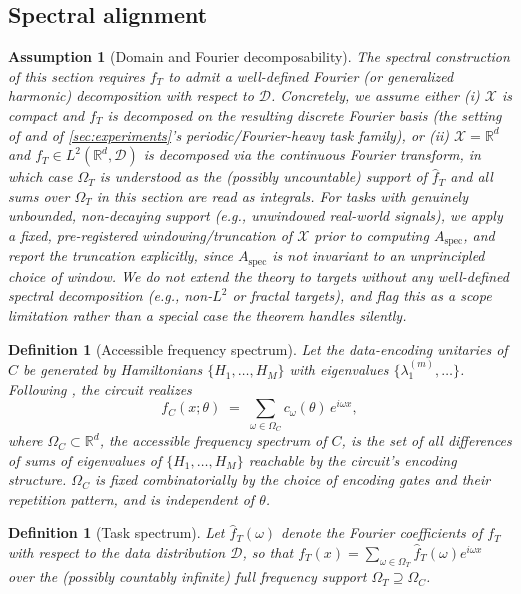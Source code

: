 \documentclass[11pt]{article}
\newtheorem{definition}[theorem]{Definition}
\newtheorem{assumption}[theorem]{Assumption}
\newcommand{\Aspec}{A_{\mathrm{spec}}}
\newcommand{\R}{\mathbb{R}}
\newcommand{\fT}{f_T}
\newcommand{\Omc}{\Omega_C}
\newcommand{\Omt}{\Omega_T}
\begin{document}
\subsection{Spectral alignment}
\label{sec:spectral-alignment}

\begin{assumption}[Domain and Fourier decomposability]
\label{ass:domain}
The spectral construction of this section requires $\fT$ to admit a well-defined Fourier (or generalized harmonic) decomposition with respect to $\mathcal{D}$. Concretely, we assume either (i) $\mathcal{X}$ is compact and $\fT$ is decomposed on the resulting discrete Fourier basis (the setting of \citet{schuld2021effect} and of \cref{sec:experiments}'s periodic/Fourier-heavy task family), or (ii) $\mathcal{X} = \R^d$ and $\fT \in L^2(\R^d,\mathcal{D})$ is decomposed via the continuous Fourier transform, in which case $\Omt$ is understood as the (possibly uncountable) support of $\hat\fT$ and all sums over $\Omt$ in this section are read as integrals. For tasks with genuinely unbounded, non-decaying support (e.g., unwindowed real-world signals), we apply a fixed, pre-registered windowing/truncation of $\mathcal{X}$ prior to computing $\Aspec$, and report the truncation explicitly, since $\Aspec$ is not invariant to an unprincipled choice of window. We do not extend the theory to targets without any well-defined spectral decomposition (e.g., non-$L^2$ or fractal targets), and flag this as a scope limitation rather than a special case the theorem handles silently.
\end{assumption}

\begin{definition}[Accessible frequency spectrum]
Let the data-encoding unitaries of $C$ be generated by Hamiltonians $\{H_1,\dots,H_M\}$ with eigenvalues $\{\lambda_1^{(m)},\dots\}$. Following \citet{schuld2021effect}, the circuit realizes
\[
    f_C(x;\theta) \;=\; \sum_{\omega \in \Omc} c_\omega(\theta)\, e^{i \omega x},
\]
where $\Omc \subset \R^d$, the \emph{accessible frequency spectrum} of $C$, is the set of all differences of sums of eigenvalues of $\{H_1,\dots,H_M\}$ reachable by the circuit's encoding structure. $\Omc$ is fixed combinatorially by the choice of encoding gates and their repetition pattern, and is independent of $\theta$.
\end{definition}

\begin{definition}[Task spectrum]
Let $\hat\fT(\omega)$ denote the Fourier coefficients of $\fT$ with respect to the data distribution $\mathcal{D}$, so that $\fT(x) = \sum_{\omega \in \Omt} \hat\fT(\omega) e^{i\omega x}$ over the (possibly countably infinite) full frequency support $\Omt \supseteq \Omc$.
\end{definition}
\end{document}
